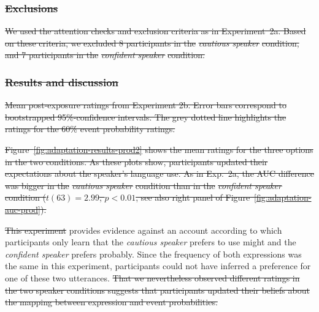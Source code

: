 \documentclass[man, floatsintext]{apa6}
\newcommand{\figref}[1]{Figure~\ref{#1}}
\providecommand{\DIFadd}[1]{{\protect\color{blue}\uwave{#1}}} %
\providecommand{\DIFdel}[1]{{\protect\color{red}\sout{#1}}}                      %
\providecommand{\DIFaddbegin}{} %
\providecommand{\DIFaddend}{} %
\providecommand{\DIFdelbegin}{} %
\providecommand{\DIFdelend}{} %
\providecommand{\DIFdelFL}[1]{\DIFdel{#1}} %
\newcommand{\DIFscaledelfig}{0.5}
\newlength{\DIFdelgraphicswidth} %
\newlength{\DIFdelgraphicsheight} %
\newcommand{\DIFaddincludegraphics}[2][]{{\color{blue}\fbox{\DIFOincludegraphics[#1]{#2}}}} %
\newcommand{\DIFdelincludegraphics}[2][]{%
\sbox{\DIFdelgraphicsbox}{\DIFOincludegraphics[#1]{#2}}%
\settoboxwidth{\DIFdelgraphicswidth}{\DIFdelgraphicsbox} %
\settoboxtotalheight{\DIFdelgraphicsheight}{\DIFdelgraphicsbox} %
\scalebox{\DIFscaledelfig}{%
\parbox[b]{\DIFdelgraphicswidth}{\usebox{\DIFdelgraphicsbox}\\[-\baselineskip] \rule{\DIFdelgraphicswidth}{0em}}\llap{\resizebox{\DIFdelgraphicswidth}{\DIFdelgraphicsheight}{%
\setlength{\unitlength}{\DIFdelgraphicswidth}%
\begin{picture}(1,1)%
\thicklines\linethickness{2pt} %
{\color[rgb]{1,0,0}\put(0,0){\framebox(1,1){}}}%
{\color[rgb]{1,0,0}\put(0,0){\line( 1,1){1}}}%
{\color[rgb]{1,0,0}\put(0,1){\line(1,-1){1}}}%
\end{picture}%
}\hspace*{3pt}}} %
} %
\DeclareRobustCommand{\DIFaddbegin}{\DIFOaddbegin \let\includegraphics\DIFaddincludegraphics} %
\DeclareRobustCommand{\DIFaddend}{\DIFOaddend \let\includegraphics\DIFOincludegraphics} %
\DeclareRobustCommand{\DIFdelbegin}{\DIFOdelbegin \let\includegraphics\DIFdelincludegraphics} %
\DeclareRobustCommand{\DIFdelend}{\DIFOaddend \let\includegraphics\DIFOincludegraphics} %
\begin{document}
\subsubsection{\DIFdel{Exclusions}} %
\addtocounter{subsubsection}{-1}%
\DIFdel{We used the attention checks and exclusion criteria as in Experiment~2a.  Based on these criteria, we excluded 8 participants in the }\textit{\DIFdel{cautious speaker}} %
\DIFdel{condition, and 7 participants in the }\textit{\DIFdel{confident speaker}} %
\DIFdel{condition.
}%

\subsubsection{\DIFdel{Results and discussion}}
\addtocounter{subsubsection}{-1}%

{%
\DIFdelFL{Mean post-exposure ratings from Experiment 2b. Error bars correspond to bootstrapped 95\%-confidence intervals.  The grey dotted line highlights the ratings for the 60\% event probability ratings. }%
}

\DIFdel{Figure~\ref{fig:adaptation-results-prod2} shows the mean ratings for the three options in the two conditions. As these plots show, participants updated their expectations about the speaker's language use. As in Exp.~2a, the
AUC difference was bigger in the }\emph{\DIFdel{cautious speaker}} %
\DIFdel{condition than in the }\emph{\DIFdel{confident speaker}} %
\DIFdel{condition ($t(63) = 2.99$, $p < 0.01$, see also right panel of \figref{fig:adaptation-auc-prod}). 
}%

\DIFdel{This experiment }\DIFdelend \DIFaddbegin \DIFadd{This experiment further }\DIFaddend provides evidence against an account according to which participants only learn that the \emph{cautious speaker} prefers to use {\sc might} and the {\it confident speaker} prefers {\sc probably}. Since the frequency of both expressions was the same in this experiment, participants could not have inferred a preference for one of these two utterances. 
\DIFdelbegin \DIFdel{That we nevertheless observed different ratings in the two speaker conditions suggests that participants updated their beliefs about the mapping between expression and event probabilities.
}\DIFdelend 
\end{document}

